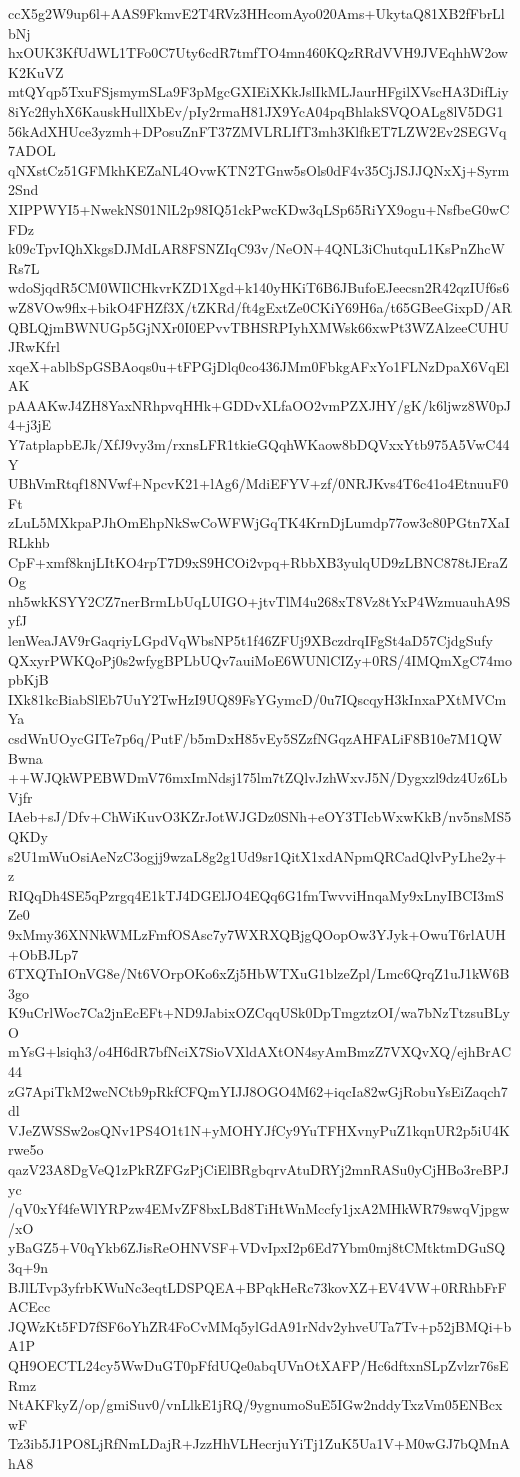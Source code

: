 ccX5g2W9up6l+AAS9FkmvE2T4RVz3HHcomAyo020Ams+UkytaQ81XB2fFbrLlbNj
hxOUK3KfUdWL1TFo0C7Uty6cdR7tmfTO4mn460KQzRRdVVH9JVEqhhW2owK2KuVZ
mtQYqp5TxuFSjsmymSLa9F3pMgcGXIEiXKkJslIkMLJaurHFgilXVscHA3DifLiy
8iYc2flyhX6KauskHullXbEv/pIy2rmaH81JX9YcA04pqBhlakSVQOALg8lV5DG1
56kAdXHUce3yzmh+DPosuZnFT37ZMVLRLIfT3mh3KlfkET7LZW2Ev2SEGVq7ADOL
qNXstCz51GFMkhKEZaNL4OvwKTN2TGnw5sOls0dF4v35CjJSJJQNxXj+Syrm2Snd
XIPPWYI5+NwekNS01NlL2p98IQ51ckPwcKDw3qLSp65RiYX9ogu+NsfbeG0wCFDz
k09cTpvIQhXkgsDJMdLAR8FSNZIqC93v/NeON+4QNL3iChutquL1KsPnZhcWRs7L
wdoSjqdR5CM0WIlCHkvrKZD1Xgd+k140yHKiT6B6JBufoEJeecsn2R42qzIUf6s6
wZ8VOw9flx+bikO4FHZf3X/tZKRd/ft4gExtZe0CKiY69H6a/t65GBeeGixpD/AR
QBLQjmBWNUGp5GjNXr0I0EPvvTBHSRPIyhXMWsk66xwPt3WZAlzeeCUHUJRwKfrl
xqeX+ablbSpGSBAoqs0u+tFPGjDlq0co436JMm0FbkgAFxYo1FLNzDpaX6VqElAK
pAAAKwJ4ZH8YaxNRhpvqHHk+GDDvXLfaOO2vmPZXJHY/gK/k6ljwz8W0pJ4+j3jE
Y7atplapbEJk/XfJ9vy3m/rxnsLFR1tkieGQqhWKaow8bDQVxxYtb975A5VwC44Y
UBhVmRtqf18NVwf+NpcvK21+lAg6/MdiEFYV+zf/0NRJKvs4T6c41o4EtnuuF0Ft
zLuL5MXkpaPJhOmEhpNkSwCoWFWjGqTK4KrnDjLumdp77ow3c80PGtn7XaIRLkhb
CpF+xmf8knjLItKO4rpT7D9xS9HCOi2vpq+RbbXB3yulqUD9zLBNC878tJEraZOg
nh5wkKSYY2CZ7nerBrmLbUqLUIGO+jtvTlM4u268xT8Vz8tYxP4WzmuauhA9SyfJ
lenWeaJAV9rGaqriyLGpdVqWbsNP5t1f46ZFUj9XBczdrqIFgSt4aD57CjdgSufy
QXxyrPWKQoPj0s2wfygBPLbUQv7auiMoE6WUNlCIZy+0RS/4IMQmXgC74mopbKjB
IXk81kcBiabSlEb7UuY2TwHzI9UQ89FsYGymcD/0u7IQscqyH3kInxaPXtMVCmYa
csdWnUOycGITe7p6q/PutF/b5mDxH85vEy5SZzfNGqzAHFALiF8B10e7M1QWBwna
++WJQkWPEBWDmV76mxImNdsj175lm7tZQlvJzhWxvJ5N/Dygxzl9dz4Uz6LbVjfr
IAeb+sJ/Dfv+ChWiKuvO3KZrJotWJGDz0SNh+eOY3TIcbWxwKkB/nv5nsMS5QKDy
s2U1mWuOsiAeNzC3ogjj9wzaL8g2g1Ud9sr1QitX1xdANpmQRCadQlvPyLhe2y+z
RIQqDh4SE5qPzrgq4E1kTJ4DGElJO4EQq6G1fmTwvviHnqaMy9xLnyIBCI3mSZe0
9xMmy36XNNkWMLzFmfOSAsc7y7WXRXQBjgQOopOw3YJyk+OwuT6rlAUH+ObBJLp7
6TXQTnIOnVG8e/Nt6VOrpOKo6xZj5HbWTXuG1blzeZpl/Lmc6QrqZ1uJ1kW6B3go
K9uCrlWoc7Ca2jnEcEFt+ND9JabixOZCqqUSk0DpTmgztzOI/wa7bNzTtzsuBLyO
mYsG+lsiqh3/o4H6dR7bfNciX7SioVXldAXtON4syAmBmzZ7VXQvXQ/ejhBrAC44
zG7ApiTkM2wcNCtb9pRkfCFQmYIJJ8OGO4M62+iqcIa82wGjRobuYsEiZaqch7dl
VJeZWSSw2osQNv1PS4O1t1N+yMOHYJfCy9YuTFHXvnyPuZ1kqnUR2p5iU4Krwe5o
qazV23A8DgVeQ1zPkRZFGzPjCiElBRgbqrvAtuDRYj2mnRASu0yCjHBo3reBPJyc
/qV0xYf4feWlYRPzw4EMvZF8bxLBd8TiHtWnMccfy1jxA2MHkWR79swqVjpgw/xO
yBaGZ5+V0qYkb6ZJisReOHNVSF+VDvIpxI2p6Ed7Ybm0mj8tCMtktmDGuSQ3q+9n
BJlLTvp3yfrbKWuNc3eqtLDSPQEA+BPqkHeRc73kovXZ+EV4VW+0RRhbFrFACEcc
JQWzKt5FD7fSF6oYhZR4FoCvMMq5ylGdA91rNdv2yhveUTa7Tv+p52jBMQi+bA1P
QH9OECTL24cy5WwDuGT0pFfdUQe0abqUVnOtXAFP/Hc6dftxnSLpZvlzr76sERmz
NtAKFkyZ/op/gmiSuv0/vnLlkE1jRQ/9ygnumoSuE5IGw2nddyTxzVm05ENBcxwF
Tz3ib5J1PO8LjRfNmLDajR+JzzHhVLHecrjuYiTj1ZuK5Ua1V+M0wGJ7bQMnAhA8
